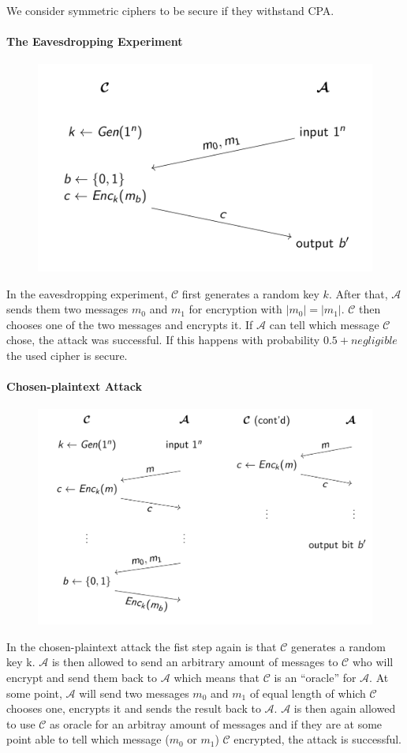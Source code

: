 We consider symmetric ciphers to be secure if they withstand CPA\@.

\paragraph{The Eavesdropping Experiment}
\begin{figure}[H]
  \centering
  \includegraphics[width=.7\textwidth]{figures/eavesdropping_experiment.png}
\end{figure}
In the eavesdropping experiment, $\mathcal{C}$ first generates a random key $k$.
After that, $\mathcal{A}$ sends them two messages $m_0$ and $m_1$ for encryption with $|m_0| = |m_1|$.
$\mathcal{C}$ then chooses one of the two messages and encrypts it.
If $\mathcal{A}$ can tell which message $\mathcal{C}$ chose, the attack was successful.
If this happens with probability $0.5 + negligible$ the used cipher is secure.

\paragraph{Chosen-plaintext Attack}
\begin{figure}[H]
  \centering
  \includegraphics[width=.8\textwidth]{figures/cpa.png}
\end{figure}
In the chosen-plaintext attack the fist step again is that $\mathcal{C}$ generates a random key k.
$\mathcal{A}$ is then allowed to send an arbitrary amount of messages to $\mathcal{C}$ who will encrypt and send them back to $\mathcal{A}$ which means that $\mathcal{C}$ is an ``oracle'' for $\mathcal{A}$.
At some point, $\mathcal{A}$ will send two messages $m_0$ and $m_1$ of equal length of which $\mathcal{C}$ chooses one, encrypts it and sends the result back to $\mathcal{A}$.
$\mathcal{A}$ is then again allowed to use $\mathcal{C}$ as oracle for an arbitray amount of messages and if they are at some point able to tell which message ($m_0$ or $m_1$) $\mathcal{C}$ encrypted, the attack is successful.



